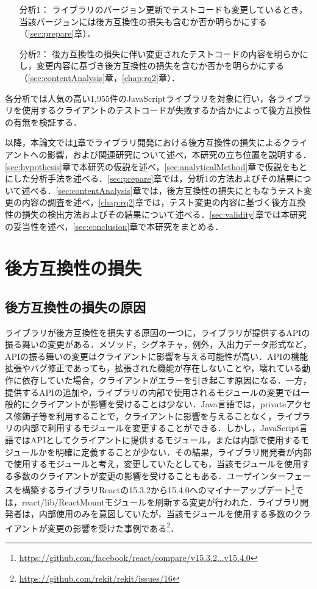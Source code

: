 \documentclass[submit]{ipsj}
\begin{document}
\begin{itemize}
\item[分析1：] ライブラリのバージョン更新でテストコードも変更しているとき，当該バージョンには後方互換性の損失も含むか否か明らかにする（\ref{sec:prepare}章）．
\item[分析2：] 後方互換性の損失に伴い変更されたテストコードの内容を明らかにし，変更内容に基づき後方互換性の損失を含むか否かを明らかにする（\ref{sec:contentAnalysis}章，\ref{chap:rq2}章）．
\end{itemize}

各分析では人気の高い1,955件のJavaScriptライブラリを対象に行い，各ライブラリを使用するクライアントのテストコードが失敗するか否かによって後方互換性の有無を検証する．

以降，本論文では\ref{sec:backward-compatibility}章でライブラリ開発における後方互換性の損失によるクライアントへの影響，および関連研究について述べ，本研究の立ち位置を説明する．\ref{sec:hypothesis}章で本研究の仮説を述べ，\ref{sec:analyticalMethod}章で仮説をもとにした分析手法を述べる．\ref{sec:prepare}章では，分析1の方法およびその結果について述べる．\ref{sec:contentAnalysis}章では，後方互換性の損失にともなうテスト変更の内容の調査を述べ，\ref{chap:rq2}章では，テスト変更の内容に基づく後方互換性の損失の検出方法およびその結果について述べる．\ref{sec:validity}章では本研究の妥当性を述べ，\ref{sec:conclusion}章で本研究をまとめる．

\section{後方互換性の損失}\label{sec:backward-compatibility}

\subsection{後方互換性の損失の原因}
ライブラリが後方互換性を損失する原因の一つに，ライブラリが提供するAPIの振る舞いの変更がある．メソッド，シグネチャ，例外，入出力データ形式など，APIの振る舞いの変更はクライアントに影響を与える可能性が高い．APIの機能拡張やバグ修正であっても，拡張された機能が存在しないことや，壊れている動作に依存していた場合，クライアントがエラーを引き起こす原因になる．一方，提供するAPIの追加や，ライブラリの内部で使用されるモジュールの変更では一般的にクライアントが影響を受けることは少ない．Java言語では，privateアクセス修飾子等を利用することで，クライアントに影響を与えることなく，ライブラリの内部で利用するモジュールを変更することができる．しかし，JavaScript言語ではAPIとしてクライアントに提供するモジュール，または内部で使用するモジュールかを明確に定義することが少ない．その結果，ライブラリ開発者が内部で使用するモジュールと考え，変更していたとしても，当該モジュールを使用する多数のクライアントが変更の影響を受けることもある．ユーザインターフェースを構築するライブラリReactの15.3.2から15.4.0へのマイナーアップデート\footnote{\url{https://github.com/facebook/react/compare/v15.3.2...v15.4.0}}では，react/lib/ReactMountモジュールを刷新する変更が行われた．ライブラリ開発者は，内部使用のみを意図していたが，当該モジュールを使用する多数のクライアントが変更の影響を受けた事例である\footnote{\url{https://github.com/rekit/rekit/issues/16}}．
\end{document}
